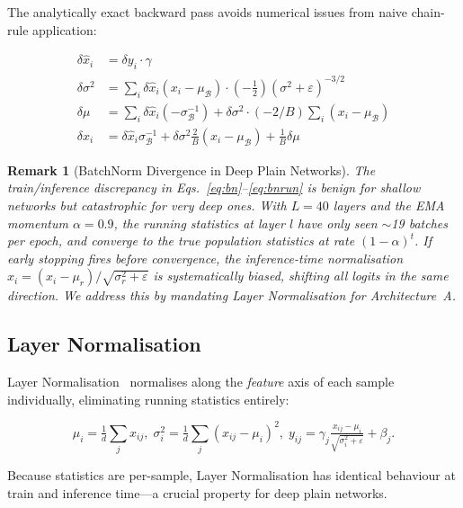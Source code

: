 \documentclass[10pt,conference,letterpaper]{IEEEtran}
\newtheorem{remark}{Remark}
\begin{document}
The analytically exact backward pass \cite{ioffe2015batchnorm} avoids numerical
issues from naive chain-rule application:
\begin{tcolorbox}[eqbox]
\begin{align}
  \delta\hat{x}_i       &= \delta y_i\cdot\gamma \nonumber\\
  \delta\sigma^2         &= {\textstyle\sum_i}\delta\hat{x}_i(x_i{-}\mu_\mathcal{B})
                           \cdot(-\tfrac{1}{2})(\sigma^2{+}\varepsilon)^{-3/2} \nonumber\\
  \delta\mu              &= {\textstyle\sum_i}\delta\hat{x}_i(-\sigma_\mathcal{B}^{-1})
                           +\delta\sigma^2\cdot(-2/B){\textstyle\sum_i}(x_i{-}\mu_\mathcal{B})\nonumber\\
  \delta x_i             &= \delta\hat{x}_i\sigma_\mathcal{B}^{-1}
                           +\delta\sigma^2\tfrac{2}{B}(x_i{-}\mu_\mathcal{B})
                           +\tfrac{1}{B}\delta\mu \label{eq:bnback}
\end{align}
\end{tcolorbox}

\begin{remark}[BatchNorm Divergence in Deep Plain Networks]
\label{rem:bnfail}
The train/inference discrepancy in Eqs.~\eqref{eq:bn}--\eqref{eq:bnrun} is
benign for shallow networks but catastrophic for very deep ones. With $L=40$
layers and the EMA momentum $\alpha=0.9$, the running statistics at layer $l$
have only seen $\sim$19 batches per epoch, and converge to the true population
statistics at rate $(1-\alpha)^t$. If early stopping fires before convergence,
the inference-time normalisation $\hat{x}_i=(x_i-\mu_r)/\sqrt{\sigma^2_r+\varepsilon}$
is systematically biased, shifting all logits in the same direction. We address
this by mandating Layer Normalisation for Architecture~A.
\end{remark}

\subsection{Layer Normalisation}

Layer Normalisation~\cite{ba2016layernorm} normalises along the \emph{feature}
axis of each sample individually, eliminating running statistics entirely:
\begin{tcolorbox}[eqbox]
\[
  \mu_i = \tfrac{1}{d}{\textstyle\sum_j}x_{ij},\;
  \sigma^2_i = \tfrac{1}{d}{\textstyle\sum_j}(x_{ij}{-}\mu_i)^2,\;
  y_{ij} = \gamma_j\tfrac{x_{ij}-\mu_i}{\sqrt{\sigma^2_i+\varepsilon}}+\beta_j.
\]
\end{tcolorbox}
Because statistics are per-sample, Layer Normalisation has identical behaviour
at train and inference time---a crucial property for deep plain networks.
\end{document}
